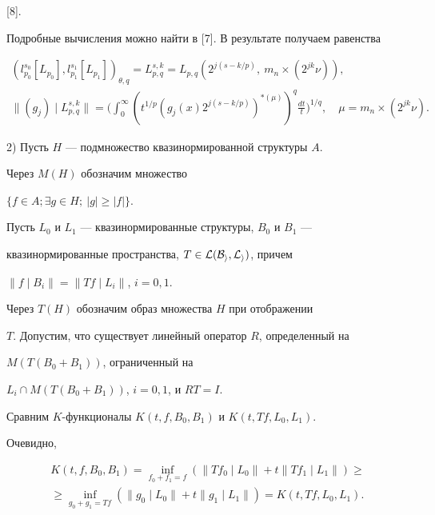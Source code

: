 [8]. 


Подробные вычисления можно найти в [7]. В результате получаем равенства 


\begin{gather*} 


(l^{s_0}_{p_0}[L_{p_0}],l^{s_1}_{p_1}[L_{p_1}])_{\theta,q}= 


L^{s,k}_{p,q}=L_{p,q}(2^{j(s-k/p)},\ m_n\times(2^{jk}\nu)), \\ 


%


\|(g_j)\mid L^{s,k}_{p,q}\|=\bigg(\int^\infty_0 


(t^{1/p}(g_j(x)2^{j(s-k/p)})^{*(\mu)})^q\frac{dt}{t}\bigg)^{1/q},\quad 


\mu=m_n\times(2^{jk}\nu). 


\end{gather*} 


 


2) Пусть $H$ --- подмножество квазинормированной структуры $A$. 


Через $M(H)$ обозначим множество 


$\{f\in A;\exists g\in H;\ |g|\ge|f|\}$. 


 


Пусть $L_0$ и $L_1$ --- квазинормированные структуры, $B_0$ и $B_1$ --- 


квазинормированные пространства, $T\in\cal L(B_i,L_i)$, причем 


$\|f\mid B_i\|=\|T f\mid L_i\|$, $i=0,1$. 


Через $T(H)$ обозначим образ множества $H$ при отображении 


$T$. Допустим, что существует линейный оператор $R$, определенный на  


$M(T(B_0+B_1))$, ограниченный на 


$L_i\cap M(T(B_0+B_1))$, $i=0,1$, и $RT=I$. 


Сравним $K$-функционалы $K(t,f,B_0,B_1)$ и $K(t,Tf,L_0,L_1)$. 


Очевидно, 


\begin{multline*} 


K(t,f,B_0,B_1)=\inf_{f_0+f_1=f}(\|Tf_0\mid L_0\|+ 


t\|Tf_1\mid L_1\|)\ge \\


\ge \inf_{g_0+g_1=Tf} 


(\|g_0\mid L_0\|+t\|g_1\mid L_1\|)=K(t,Tf,L_0,L_1). 


\end{multline*}  


